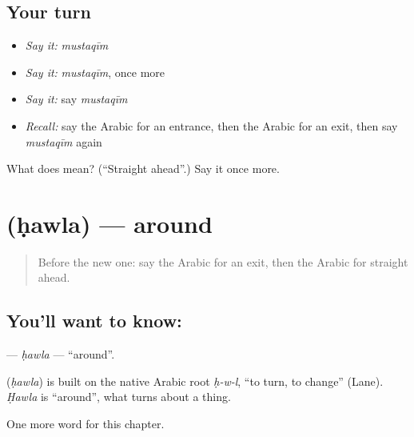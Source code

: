 \subsection*{Your turn}
\begin{itemize}
\raggedright
  \item \emph{Say it:} \emph{mustaqīm}
  \item \emph{Say it:} \emph{mustaqīm}, once more
  \item \emph{Say it:} say \emph{mustaqīm}
  \item \emph{Recall:} say the Arabic for an entrance, then the Arabic for an exit, then say \emph{mustaqīm} again
\end{itemize}

\begin{tcolorbox}[breakable,colback=teal!4,colframe=teal!35!black,title={Before you move on}]
What does  mean? (\textquotedblleft{}Straight ahead\textquotedblright{}.) Say it once more.
\end{tcolorbox}
\section[\texorpdfstring{\ar{حول} (ḥawla)}{حول (ḥawla)}]{ (ḥawla) — around}

\label{lesson:AR-C105-hawla}



\begin{quote}
Before the new one: say the Arabic for an exit, then the Arabic for straight ahead.
\end{quote}

\subsection*{You'll want to know: }
\textbf{} — \emph{ḥawla} — \textquotedblleft{}around\textquotedblright{}.

\begin{cousinweb}
\textbf{} (\emph{ḥawla}) is built on the native Arabic root \emph{ḥ-w-l}, \textquotedblleft{}to turn, to change\textquotedblright{} (Lane). \emph{Ḥawla} is \textquotedblleft{}around\textquotedblright{}, what turns about a thing.
\end{cousinweb}

\begin{grammarlens}[title={What you've built}]
One more word for this chapter.
\end{grammarlens}

